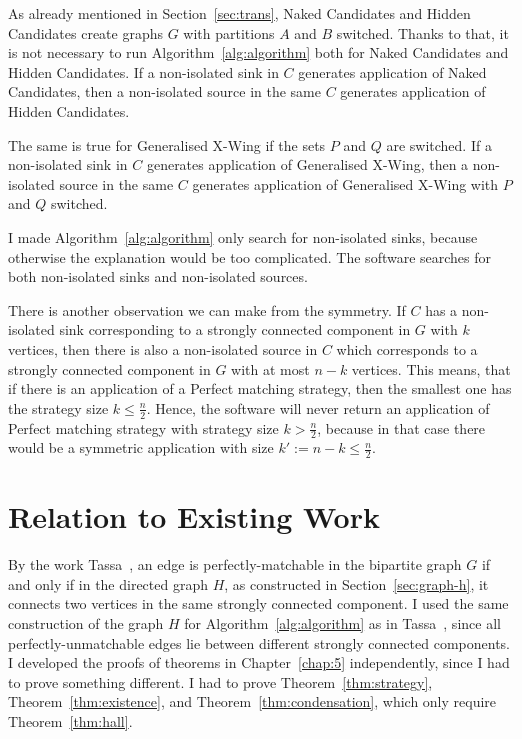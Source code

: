 As already mentioned in Section~\ref{sec:trans},
Naked Candidates and Hidden Candidates create graphs $G$ with partitions $A$ and $B$ switched.
Thanks to that, it is not necessary to run Algorithm~\ref{alg:algorithm}
both for Naked Candidates and Hidden Candidates.
If a non-isolated sink in $C$ generates application of Naked Candidates,
then a non-isolated source in the same $C$ generates application of Hidden Candidates.

The same is true for Generalised X-Wing if the sets $P$ and $Q$ are switched.
If a non-isolated sink in $C$ generates application of Generalised X-Wing,
then a non-isolated source in the same $C$ generates application of Generalised X-Wing with $P$ and $Q$ switched.

I made Algorithm~\ref{alg:algorithm} only search for non-isolated sinks,
because otherwise the explanation would be too complicated.
The software searches for both non-isolated sinks and non-isolated sources.

There is another observation we can make from the symmetry.
If $C$ has a non-isolated sink corresponding to a strongly connected component in $G$ with $k$ vertices,
then there is also a non-isolated source in $C$ which corresponds to a strongly connected component in $G$
with at most $n - k$ vertices.
This means, that if there is an application of a Perfect matching strategy,
then the smallest one has the strategy size $k \leq \frac{n}{2}$.
Hence, the software will never return an application of Perfect matching strategy with strategy size $k > \frac{n}{2}$,
because in that case there would be a symmetric application with size $k' := n - k \leq \frac{n}{2}$.

\section{Relation to Existing Work}

By the work Tassa~\cite{tassa2012}, an edge is perfectly-matchable in the bipartite graph $G$
if and only if in the directed graph $H$, as constructed in Section~\ref{sec:graph-h},
it connects two vertices in the same strongly connected component.
I used the same construction of the graph $H$ for Algorithm~\ref{alg:algorithm} as in Tassa~\cite{tassa2012},
since all perfectly-unmatchable edges lie between different strongly connected components.
I developed the proofs of theorems in Chapter~\ref{chap:5} independently,
since I had to prove something different.
I had to prove Theorem~\ref{thm:strategy}, Theorem~\ref{thm:existence}, and Theorem~\ref{thm:condensation},
which only require Theorem~\ref{thm:hall}.
